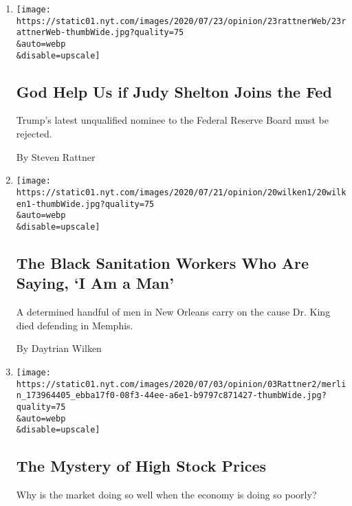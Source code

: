 \begin{enumerate}
\def\labelenumi{\arabic{enumi}.}
\item
  \href{/2020/07/22/opinion/federal-reserve-judy-shelton.html}{}

  \texttt{[image: https://static01.nyt.com/images/2020/07/23/opinion/23rattnerWeb/23rattnerWeb-thumbWide.jpg?quality=75\\\&auto=webp\\\&disable=upscale]}

  \hypertarget{god-help-us-if-judy-shelton-joins-the-fed}{%
  \subsection{God Help Us if Judy Shelton Joins the
  Fed}\label{god-help-us-if-judy-shelton-joins-the-fed}}

  Trump's latest unqualified nominee to the Federal Reserve Board must
  be rejected.

  By Steven Rattner
\item
  \href{/2020/07/20/opinion/new-orleans-garbage-strike.html}{}

  \texttt{[image: https://static01.nyt.com/images/2020/07/21/opinion/20wilken1/20wilken1-thumbWide.jpg?quality=75\\\&auto=webp\\\&disable=upscale]}

  \hypertarget{the-black-sanitation-workers-who-are-saying-i-am-a-man}{%
  \subsection{The Black Sanitation Workers Who Are Saying, `I Am a
  Man'}\label{the-black-sanitation-workers-who-are-saying-i-am-a-man}}

  A determined handful of men in New Orleans carry on the cause Dr. King
  died defending in Memphis.

  By Daytrian Wilken
\item
  \href{/2020/07/03/opinion/stock-market.html}{}

  \texttt{[image: https://static01.nyt.com/images/2020/07/03/opinion/03Rattner2/merlin\_173964405\_ebba17f0-08f3-44ee-a6e1-b9797c871427-thumbWide.jpg?quality=75\\\&auto=webp\\\&disable=upscale]}

  \hypertarget{the-mystery-of-high-stock-prices}{%
  \subsection{The Mystery of High Stock
  Prices}\label{the-mystery-of-high-stock-prices}}

  Why is the market doing so well when the economy is doing so poorly?


\end{enumerate}
